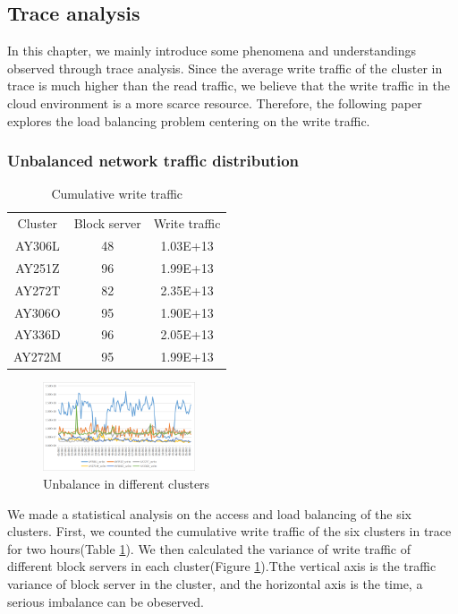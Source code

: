 \subsection{Trace analysis}
\label{sec3.1-0}

In this chapter, we mainly introduce some phenomena and understandings observed through trace analysis. Since the average write traffic of the cluster in trace is much higher than the read traffic, we believe that the write traffic in the cloud environment is a more scarce resource. Therefore, the following paper explores the load balancing problem centering on the write traffic.

\subsubsection{Unbalanced network traffic distribution} 
\label{sec3.1-1}
\begin{table}[ht]
    \small
    \centering
    \begin{tabular}{c|c|c}
         Cluster &Block server&Write traffic\\
         AY306L & 48 & 1.03E+13 \\
         AY251Z & 96 & 1.99E+13 \\
         AY272T & 82 & 2.35E+13 \\
         AY306O & 95 & 1.90E+13 \\
         AY336D & 96 & 2.05E+13 \\
         AY272M & 95 & 1.99E+13 \\
    \end{tabular}
    \caption{Cumulative write traffic}
    \label{table3.1-1}
\end{table}
\begin{figure}[ht]
    \centering
    \includegraphics[width=0.4\textwidth]{Figure-3.1/Figure_3-1.png}
    \caption{Unbalance in different clusters}
    \label{fig3-1}
\end{figure}
We made a statistical analysis on the access and load balancing of the six clusters. First, we counted the cumulative write traffic of the six clusters in trace for two hours(Table \ref{table3.1-1}). We then calculated the variance of write traffic of different block servers in each cluster(Figure \ref{fig3-1}).Tthe vertical axis is the traffic variance of block server in the cluster, and the horizontal axis is the time, a serious imbalance can be obeserved.




